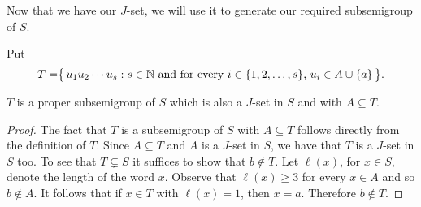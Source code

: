 Now that we have our $J$-set, we will use it to generate our required subsemigroup of $S$.

\begin{defn}
  Put 
  \[
    T = \bigr\{\, u_1u_2\cdots u_s : \mbox{$s \in \mathbb{N}$ and for every $i \in \{1, 2, \ldots, s\}$, $u_i \in A \cup\{a\}$} \,\bigr\}.
  \]
\end{defn}

\begin{lem}
  $T$ is a proper subsemigroup of $S$ which is also a $J$-set in $S$ and with $A \subseteq T$.
\end{lem}
\begin{proof}
  The fact that $T$ is a subsemigroup of $S$ with $A \subseteq T$ follows directly from the definition of $T$.
  Since $A \subseteq T$ and $A$ is a $J$-set in $S$, we have that $T$ is a $J$-set in $S$ too.
  To see that $T \subsetneq S$ it suffices to show that $b \not\in T$.
  Let $\ell(x)$, for $x \in S$, denote the length of the word $x$.
  Observe that $\ell(x) \ge 3$ for every $x \in A$ and so $b \not\in A$.
  It follows that if $x \in T$ with $\ell(x) = 1$, then $x = a$.
  Therefore $b \not\in T$. 
\end{proof}

